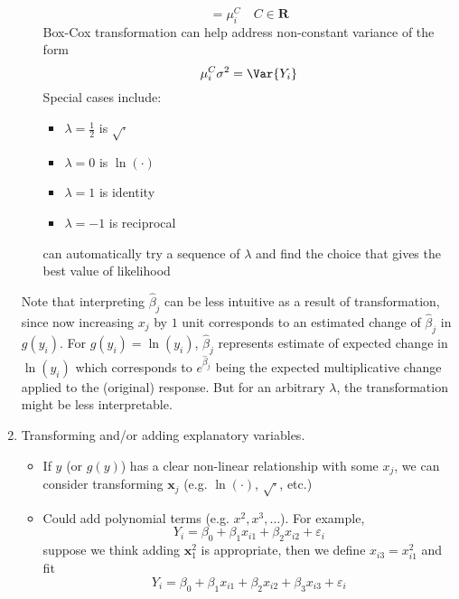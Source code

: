 \begin{enumerate}[label=(\arabic*)]
\begin{enumerate}[label=(\roman*)]
\[                              =\mu_i^C \quad {C\in\mathbf{R}}  \]
                        Box-Cox transformation can help address non-constant
                        variance of the form
                        \[ \mu_i^C\sigma^2=\Var{Y_i} \]
                        Special cases include:
                        \begin{itemize}
                              \item $ \displaystyle \lambda=\frac{1}{2} $ is $ \sqrt{\cdot} $
                              \item $ \lambda=0 $ is $ \ln(\cdot) $
                              \item $ \lambda=1 $ is identity
                              \item $ \lambda=-1 $ is reciprocal
                        \end{itemize}
                        can automatically try a sequence of $ \lambda $
                        and find the choice that gives the best value of
                        likelihood
            \end{enumerate}
            Note that interpreting $ \hat{\beta}_j $ can be less intuitive
            as a result of transformation, since now increasing $ x_j $
            by $ 1 $ unit corresponds to an estimated change of $ \hat{\beta}_j $
            in $ g(y_i) $. For $ g(y_i)=\ln(y_i) $, $ \hat{\beta}_j $
            represents estimate of expected change in $ \ln(y_i) $
            which corresponds to $ e^{\hat{\beta}_j} $ being
            the expected multiplicative change applied to the (original)
            response. But for an arbitrary $ \lambda $, the transformation
            might be less interpretable.
      \item Transforming and/or adding explanatory variables.
            \begin{itemize}
                  \item If $ y $ (or $ g(y) $) has a clear non-linear
                        relationship with some $ x_j $, we can consider transforming
                        $ \symbf{x}_j $ (e.g. $ \ln(\cdot) $, $ \sqrt{\cdot} $, etc.)
                  \item Could add polynomial terms (e.g. $ x^2,x^3,\ldots$). For example,
                        \[ Y_i=\beta_0+\beta_1x_{i1}+\beta_2x_{i2}+\varepsilon_i \]
                        suppose we think adding $ \symbf{x}_1^2 $ is appropriate,
                        then we define $ x_{i3}=x_{i1}^2 $ and fit
                        \[ Y_i=\beta_0+\beta_1x_{i1}+\beta_2x_{i2}+\beta_3x_{i3}+\varepsilon_i \]

\end{itemize}
\end{enumerate}
